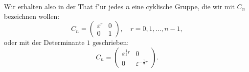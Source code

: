 \documentclass[12pt,a4paper]{article}
\theoremstyle{definition}
\begin{document}
Wir erhalten also in der That f"ur jedes $n$ eine cyklische Gruppe, die wir mit $C_n$ bezeichnen wollen:
\begin{equation}\label{eq:55-3}
C_n = \begin{pmatrix} \varepsilon^r & 0 \\ 0 & 1 \end{pmatrix}, \quad r = 0, 1, \ldots, n-1,
\end{equation}
oder mit der Determinante $1$ geschrieben:
\begin{equation}\label{eq:55-4}
C_n = \begin{pmatrix} \varepsilon^{\frac{1}{2}r} & 0 \\ 0 & \varepsilon^{-\frac{1}{2}r} \end{pmatrix}.
\end{equation}
\end{document}
